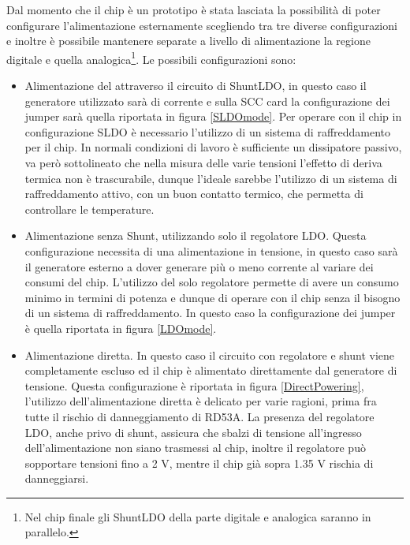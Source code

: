 Dal momento che il chip è un prototipo è stata lasciata la possibilità di poter configurare l'alimentazione esternamente scegliendo tra tre diverse configurazioni e inoltre è possibile mantenere separate a livello di alimentazione la regione digitale e quella analogica\footnote{Nel chip finale gli ShuntLDO della parte digitale e analogica saranno in parallelo.}.
Le possibili configurazioni sono:
\begin{itemize}

\item Alimentazione del attraverso il circuito di ShuntLDO, in questo caso il generatore utilizzato sarà di corrente e sulla SCC card la configurazione dei jumper sarà quella riportata in figura \ref{SLDOmode}. 
Per operare con il chip in configurazione SLDO è necessario l'utilizzo di un sistema di raffreddamento per il chip. 
In normali condizioni di lavoro è sufficiente un dissipatore passivo, va però sottolineato che nella misura delle varie tensioni l'effetto di deriva termica non è trascurabile, dunque l'ideale sarebbe l'utilizzo di un sistema di raffreddamento attivo, con un buon contatto termico, che permetta di controllare le temperature.

\item Alimentazione senza Shunt, utilizzando solo il regolatore LDO. Questa configurazione necessita di una alimentazione in tensione, in questo caso sarà il generatore esterno a dover generare più o meno corrente al variare dei consumi del chip. L'utilizzo del solo regolatore permette di avere un consumo minimo in termini di potenza e dunque di operare con il chip senza il bisogno di un sistema di raffreddamento. In questo caso la configurazione dei jumper è quella riportata in figura \ref{LDOmode}.

\item Alimentazione diretta. In questo caso il circuito con regolatore e shunt viene completamente escluso ed il chip è alimentato direttamente dal generatore di tensione. 
Questa configurazione è riportata in figura \ref{DirectPowering}, l'utilizzo dell'alimentazione diretta è delicato per varie ragioni, prima fra tutte il rischio di danneggiamento di RD53A. 
La presenza del regolatore LDO, anche privo di shunt, assicura che sbalzi di tensione all'ingresso dell'alimentazione non siano trasmessi al chip, inoltre il regolatore può sopportare tensioni fino a 2 V, mentre il chip già sopra 1.35 V rischia di danneggiarsi. 
\end{itemize}

